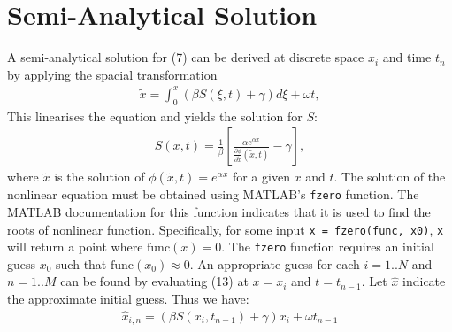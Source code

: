 \documentclass[11pt]{article}
\begin{document}
\section{Semi-Analytical Solution}
A semi-analytical solution for (7) can be derived at discrete space $x_i$ and time $t_n$ by applying the spacial transformation 
\begin{eqnarray}
\tilde x = \int_0^x (\beta S(\xi,t)+\gamma)d\xi + \omega t,
\end{eqnarray}
This linearises the equation and yields the solution for $S$:
\begin{eqnarray}
S(x,t) = \frac{1}{\beta}\left[\frac{\alpha e^{\alpha x}}{\frac{\partial\phi}{\partial\tilde x}(\tilde x,t)}-\gamma\right],
\end{eqnarray}
where $\tilde x$ is the solution of $\phi(\tilde x,t)=e^{\alpha x}$ for a given $x$ and $t$. 
The solution of the nonlinear equation must be obtained using MATLAB's \verb|fzero| function. The MATLAB documentation for this function indicates that it is used to find the roots of nonlinear function. Specifically, for some input \verb|x = fzero(func, x0)|, \verb|x| will return a point where $\text{func}(x) = 0$. The \verb|fzero| function requires an initial guess $x_0$ such that $\text{func}(x_0) \approx 0$. An appropriate guess for each $i=1..N$ and $n=1..M$ can be found by evaluating (13) at $x=x_i$ and $t=t_{n-1}$. Let $\hat x$ indicate the approximate initial guess. Thus we have:
\begin{eqnarray}
\hat x_{i,n} = \left(\beta S(x_i, t_{n-1})+\gamma\right)x_i + \omega t_{n-1}
\end{eqnarray}
\end{document}
